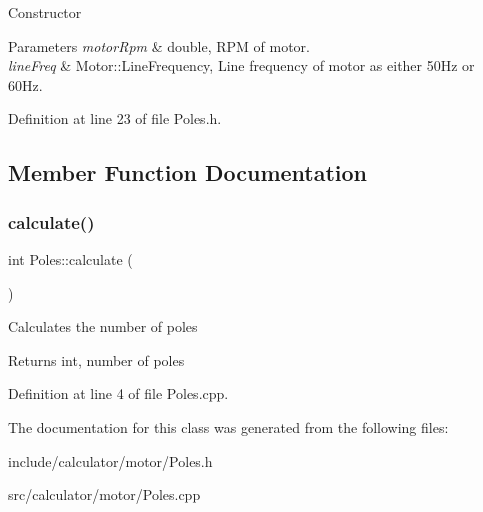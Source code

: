 Constructor 
\begin{DoxyParams}{Parameters}
{\em motor\+Rpm} & double, R\+PM of motor. \\
\hline
{\em line\+Freq} & Motor\+::\+Line\+Frequency, Line frequency of motor as either 50\+Hz or 60\+Hz. \\
\hline
\end{DoxyParams}


Definition at line 23 of file Poles.\+h.



\subsection{Member Function Documentation}
\mbox{\label{class_poles_a23988f68100374c8277dca81ab06f724}} 
\subsubsection{\texorpdfstring{calculate()}{calculate()}}
{\footnotesize\ttfamily int Poles\+::calculate (\begin{DoxyParamCaption}{ }\end{DoxyParamCaption})}

Calculates the number of poles \begin{DoxyReturn}{Returns}
int, number of poles 
\end{DoxyReturn}


Definition at line 4 of file Poles.\+cpp.



The documentation for this class was generated from the following files\+:\begin{DoxyCompactItemize}
\item 
include/calculator/motor/Poles.\+h\item 
src/calculator/motor/Poles.\+cpp\end{DoxyCompactItemize}
